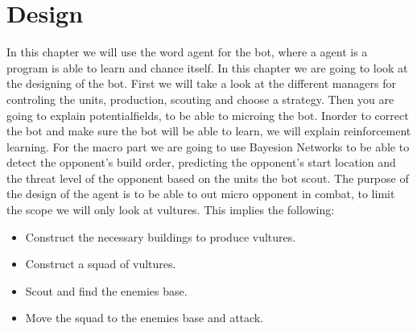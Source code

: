 \chapter{Design}\label{design}
	 In this chapter we will use the word agent for the bot, where a agent is a program is able to learn and chance itself.
	In this chapter we are going to look at the designing of the bot. First we will take a look at the different managers for controling the units, production,
	scouting and choose a strategy. Then you are going to explain potentialfields, to be able to microing the bot. Inorder to correct the bot and make
	sure the bot will be able to learn, we will explain reinforcement learning. For the macro part we are going to use Bayesion Networks to be able to
	detect the opponent's build order, predicting the opponent's start location and the threat level of the opponent based on the units the bot scout.
	The purpose of the design of the agent is to be able to out micro opponent in combat, to limit the scope we will only look at vultures. 
	This implies the following:
	\begin{itemize}
		\item Construct the necessary buildings to produce vultures.
		\item Construct a squad of vultures.
		\item Scout and find the enemies base.
		\item Move the squad to the enemies base and attack.
	\end{itemize}
	
	
	
	
	
	
	
	
